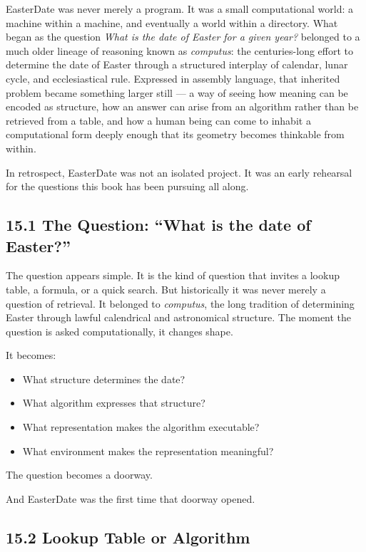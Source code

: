 \documentclass[
]{article}
\providecommand{\tightlist}{%
  \setlength{\itemsep}{0pt}\setlength{\parskip}{0pt}}
\begin{document}
EasterDate was never merely a program. It was a small computational
world: a machine within a machine, and eventually a world within a
directory. What began as the question \emph{What is the date of Easter
for a given year?} belonged to a much older lineage of reasoning known
as \emph{computus}: the centuries-long effort to determine the date of
Easter through a structured interplay of calendar, lunar cycle, and
ecclesiastical rule. Expressed in assembly language, that inherited
problem became something larger still --- a way of seeing how meaning
can be encoded as structure, how an answer can arise from an algorithm
rather than be retrieved from a table, and how a human being can come to
inhabit a computational form deeply enough that its geometry becomes
thinkable from within.

In retrospect, EasterDate was not an isolated project. It was an early
rehearsal for the questions this book has been pursuing all along.

\hypertarget{the-question-what-is-the-date-of-easter}{%
\subsection{15.1 The Question: ``What is the date of
Easter?''}\label{the-question-what-is-the-date-of-easter}}

The question appears simple. It is the kind of question that invites a
lookup table, a formula, or a quick search. But historically it was
never merely a question of retrieval. It belonged to \emph{computus},
the long tradition of determining Easter through lawful calendrical and
astronomical structure. The moment the question is asked
computationally, it changes shape.

It becomes:

\begin{itemize}
\tightlist
\item
  What structure determines the date?
\item
  What algorithm expresses that structure?
\item
  What representation makes the algorithm executable?
\item
  What environment makes the representation meaningful?
\end{itemize}

The question becomes a doorway.

And EasterDate was the first time that doorway opened.

\hypertarget{lookup-table-or-algorithm}{%
\subsection{15.2 Lookup Table or
Algorithm}\label{lookup-table-or-algorithm}}
\end{document}
